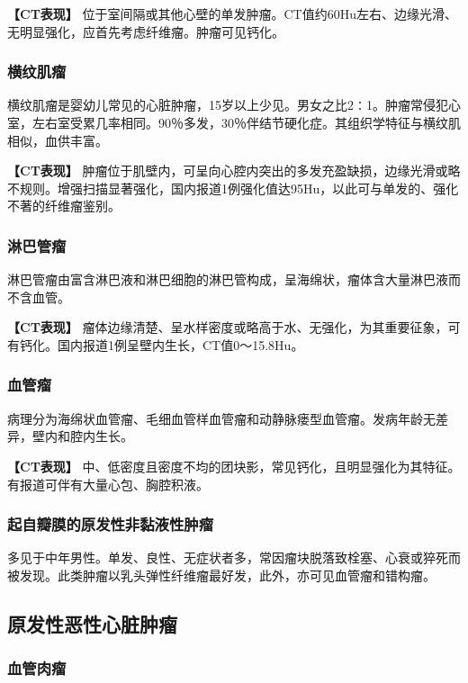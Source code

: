 \textbf{【CT表现】}
位于室间隔或其他心壁的单发肿瘤。CT值约60Hu左右、边缘光滑、无明显强化，应首先考虑纤维瘤。肿瘤可见钙化。

\subsubsection{横纹肌瘤}

横纹肌瘤是婴幼儿常见的心脏肿瘤，15岁以上少见。男女之比2∶1。肿瘤常侵犯心室，左右室受累几率相同。90％多发，30％伴结节硬化症。其组织学特征与横纹肌相似，血供丰富。

\textbf{【CT表现】}
肿瘤位于肌壁内，可呈向心腔内突出的多发充盈缺损，边缘光滑或略不规则。增强扫描显著强化，国内报道1例强化值达95Hu，以此可与单发的、强化不著的纤维瘤鉴别。

\subsubsection{淋巴管瘤}

淋巴管瘤由富含淋巴液和淋巴细胞的淋巴管构成，呈海绵状，瘤体含大量淋巴液而不含血管。

\textbf{【CT表现】}
瘤体边缘清楚、呈水样密度或略高于水、无强化，为其重要征象，可有钙化。国内报道1例呈壁内生长，CT值0～15.8Hu。

\subsubsection{血管瘤}

病理分为海绵状血管瘤、毛细血管样血管瘤和动静脉瘘型血管瘤。发病年龄无差异，壁内和腔内生长。

\textbf{【CT表现】}
中、低密度且密度不均的团块影，常见钙化，且明显强化为其特征。有报道可伴有大量心包、胸腔积液。

\subsubsection{起自瓣膜的原发性非黏液性肿瘤}

多见于中年男性。单发、良性、无症状者多，常因瘤块脱落致栓塞、心衰或猝死而被发现。此类肿瘤以乳头弹性纤维瘤最好发，此外，亦可见血管瘤和错构瘤。

\subsection{原发性恶性心脏肿瘤}

\subsubsection{血管肉瘤}

